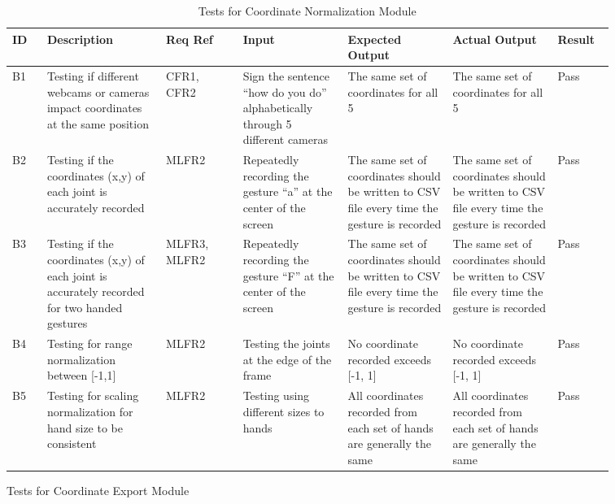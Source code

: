 \documentclass[12pt, titlepage]{article}
\begin{document}
\renewcommand{\arraystretch}{1.2}
\noindent \begin{longtable}{p{0.05\linewidth}|p{0.17\linewidth}|p{0.11\linewidth}|p{0.15\linewidth}|p{0.15\linewidth}|p{0.15\linewidth}|p{0.08\linewidth}}
\hline
\textbf{ID} & \textbf{Description} & \textbf{Req Ref} & \textbf{Input} & \textbf{Expected Output} & \textbf{Actual Output} & \textbf{Result}\\
\hline
B1 & Testing if different webcams or cameras impact coordinates at the same position & CFR1, CFR2 & Sign the sentence “how do you do” alphabetically through 5 different cameras & The same set of coordinates for all 5 & The same set of coordinates for all 5 & Pass\\ \hline
B2 & Testing if the coordinates (x,y) of each joint is accurately recorded & MLFR2 & Repeatedly recording the gesture “a” at the center of the screen & The same set of coordinates should be written to CSV file every time the gesture is recorded & The same set of coordinates should be written to CSV file every time the gesture is recorded & Pass\\ \hline
B3 & Testing if the coordinates (x,y) of each joint is accurately recorded for two handed gestures & MLFR3, MLFR2 & Repeatedly recording the gesture “F” at the center of the screen & The same set of coordinates should be written to CSV file every time the gesture is recorded & The same set of coordinates should be written to CSV file every time the gesture is recorded & Pass\\ \hline
B4 & Testing for range normalization between [-1,1] & MLFR2 & Testing the joints at the edge of the frame & No coordinate recorded exceeds [-1, 1] & No coordinate recorded exceeds [-1, 1] & Pass\\ \hline
B5 & Testing for scaling normalization for hand size to be consistent & MLFR2 & Testing using different sizes to hands & All coordinates recorded from each set of hands are generally the same & All coordinates recorded from each set of hands are generally the same & Pass
\hline
\caption{Tests for Coordinate Normalization Module}
\end{longtable}

\newpage
\centerline{Tests for Coordinate Export Module}
\end{document}
